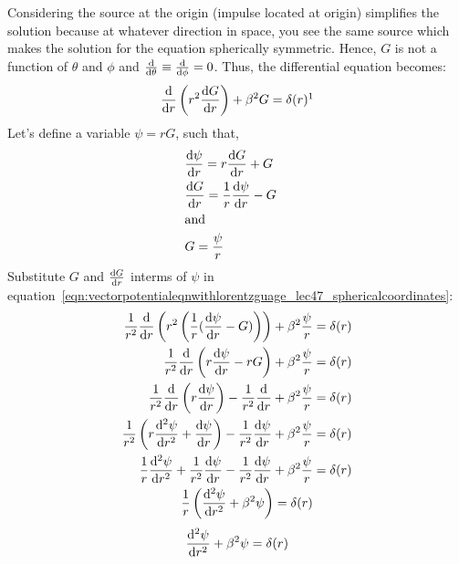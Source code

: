 Considering the source at the origin (impulse located at origin) simplifies the solution because at whatever direction in space, you see the same source which makes the solution for the equation spherically symmetric. Hence, $G$ is not a function of $\theta$ and $\phi$ and $\derivative{}{\theta} \equiv \derivative{}{\phi} = 0
$. Thus, the differential equation becomes:
\begin{equation}
\derivative{}{r}\left(r^{2}\derivative{G}{r}\right) +  \beta^{2}G = \delta(r)\footnotemark
\label{eqn:vectorpotentialeqnwithlorentzguage_lec47_sphericalcoordinates}
\end{equation}
Let's define a variable $\psi = rG$, such that,
\begin{align*}
&\derivative{\psi}{r} = r\derivative{G}{r} + G&\\
&\derivative{G}{r} = \frac{1}{r}{\derivative{\psi}{r} - G}&\\
&\text{and}&\\
&G = \frac{\psi}{r}&
\end{align*}
Substitute $G$ and $\derivative{G}{r}$ interms of $\psi$ in equation~\eqref{eqn:vectorpotentialeqnwithlorentzguage_lec47_sphericalcoordinates}:
\begin{align*}
\frac{1}{r^{2}}\derivative{}{r}\left(r^{2}
\left(\frac{1}{r}(\derivative{\psi}{r} - G) \right) \right) + \beta^{2}\frac{\psi}{r} &= \delta(r)\\
\frac{1}{r^{2}}\derivative{}{r}\left(r\derivative{\psi}{r} - rG \right) + \beta^{2}\frac{\psi}{r} &= \delta(r)\\
\frac{1}{r^{2}}\derivative{}{r}\left(r\derivative{\psi}{r} \right) - \frac{1}{r^{2}}\derivative{}{r}(rG) + \beta^{2}\frac{\psi}{r} &= \delta(r)\\
\frac{1}{r^{2}}\left(r\derivative[2]{\psi}{r} + \derivative{\psi}{r} \right) - \frac{1}{r^{2}}\derivative{\psi}{r} + \beta^{2}\frac{\psi}{r} &= \delta(r)\\
\frac{1}{r}\derivative[2]{\psi}{r} + \frac{1}{r^{2}}\derivative{\psi}{r} - \frac{1}{r^{2}}\derivative{\psi}{r} + \beta^{2}\frac{\psi}{r} &= \delta(r)\\
\frac{1}{r}\left(\derivative[2]{\psi}{r} + \beta^{2}\psi \right) = \delta(r)
\end{align*}
\begin{equation}
\derivative[2]{\psi}{r} + \beta^{2}\psi = \delta(r)\label{eqn:greenfunction}
\end{equation}
